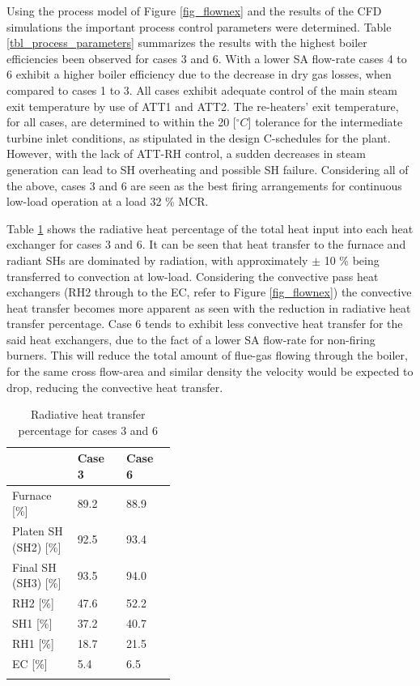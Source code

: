 \documentclass[review]{elsarticle}
\begin{document}
Using the process model of Figure \ref{fig_flownex} and the results of the CFD simulations the important process control parameters were determined. Table \ref{tbl_process_parameters} summarizes the results with the highest boiler efficiencies been observed for cases 3 and 6. With a lower SA flow-rate cases 4 to 6 exhibit a higher boiler efficiency due to the decrease in dry gas losses, when compared to cases 1 to 3. All cases exhibit adequate control of the main steam exit temperature by use of ATT1 and ATT2. The re-heaters' exit temperature, for all cases, are determined to within the 20 [$^\circ C$] tolerance for the intermediate turbine inlet conditions, as stipulated in the design C-schedules for the plant. However, with the lack of ATT-RH control, a sudden decreases in steam generation can lead to SH overheating and possible SH failure. Considering all of the above, cases 3 and 6 are seen as the best firing arrangements for continuous low-load operation at a load 32 \% MCR.

Table \ref{tbl_rad_conv} shows the radiative heat percentage of the total heat input into each heat exchanger for cases 3 and 6. It can be seen that heat transfer to the furnace and radiant SHs are dominated by radiation, with approximately $\pm$ 10 \% being transferred to convection at low-load. Considering the convective pass heat exchangers (RH2 through to the EC, refer to Figure \ref{fig_flownex}) the convective heat transfer becomes more apparent as seen with the reduction in radiative heat transfer percentage. Case 6 tends to exhibit less convective heat transfer for the said  heat exchangers, due to the fact of a lower SA flow-rate for non-firing burners. This will reduce the total amount of flue-gas flowing through the boiler, for the same cross flow-area and similar density the velocity would be expected to drop, reducing the convective heat transfer.

\begin{table}[h!]
\centering
\caption{Radiative heat transfer percentage for cases 3 and 6}
\vspace{2mm}
{\tabulinesep=1.2mm
\begin{tabularx}{\linewidth}{p{0.4\linewidth} XX}
\hline
 &\textbf{Case 3}&\textbf{Case 6}\\
\hline
Furnace [\%] & 89.2 & 88.9\\
Platen SH (SH2) [\%] & 92.5& 93.4\\
Final SH (SH3) [\%] & 93.5& 94.0\\
RH2 [\%] & 47.6& 52.2\\
SH1 [\%] & 37.2& 40.7\\
RH1 [\%] & 18.7& 21.5\\
EC [\%] & 5.4& 6.5\\
\hline
\label{tbl_rad_conv}
\end{tabularx}}
\end{table}
\end{document}
